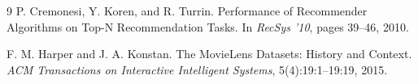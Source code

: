 \documentclass{article}
\begin{document}
\tiny
\begin{thebibliography}{9}
P. Cremonesi, Y. Koren, and R. Turrin.
\newblock Performance of Recommender Algorithms on Top-N Recommendation
Tasks.
\newblock In \emph{RecSys '10}, pages 39--46, 2010.

F. M. Harper and J. A. Konstan.
\newblock The MovieLens Datasets: History and Context.
\newblock \emph{ACM Transactions on Interactive Intelligent Systems},
5(4):19:1--19:19, 2015.

\end{thebibliography}
\end{document}
